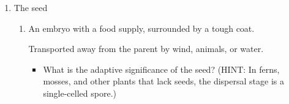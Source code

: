 \begin{frame}[t]
    \begin{adjustwidth}{-2em}{-1.5em}

        \begin{enumerate}
            \addtocounter{enumi}{4}
            \item The seed
            \begin{enumerate}
                \item An embryo with a food supply, surrounded by a tough coat.

                    \vspace{2mm}
                    Transported away from the parent by wind, animals, or
                    water.

                \begin{itemize}
                    \item What is the adaptive significance of the seed?
                        (HINT: In ferns, mosses, and other plants that lack
                        seeds, the dispersal stage is a single-celled spore.)


                \end{itemize}
            \end{enumerate}
        \end{enumerate}
    \end{adjustwidth}
\end{frame}



\clickerslide{
\begin{frame}
    \begin{clickerquestion}
        \item 
        \begin{clickeroptions}
            \item 
            \item 
            \item 
            \item 
        \end{clickeroptions}
    \end{clickerquestion}
\end{frame}
}


